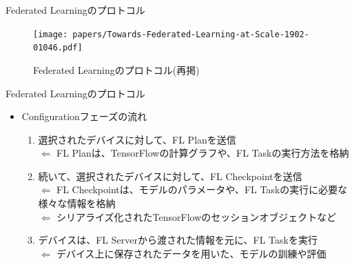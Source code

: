 \documentclass[dvipdfmx,notheorems,t]{beamer}
\begin{document}
\begin{frame}{Federated Learningのプロトコル}

\begin{figure}
	\centering
	\texttt{[image: papers/Towards-Federated-Learning-at-Scale-1902-01046.pdf]}
	\caption{Federated Learningのプロトコル(再掲)~\cite{DBLP:journals/corr/abs-1902-01046}}
\end{figure}

\end{frame}

\begin{frame}{Federated Learningのプロトコル}

\begin{itemize}
	\item Configurationフェーズの流れ
	\begin{enumerate}
		\item 選択されたデバイスに対して、FL Planを送信 \\
		$\Leftarrow$ FL Planは、TensorFlowの計算グラフや、FL Taskの実行方法を格納
		\newline
		
		\item 続いて、選択されたデバイスに対して、FL Checkpointを送信 \\
		$\Leftarrow$ FL Checkpointは、モデルのパラメータや、FL Taskの実行に必要な様々な情報を格納 \\
		$\Leftarrow$ シリアライズ化されたTensorFlowのセッションオブジェクトなど
		\newline
		
		\item デバイスは、FL Serverから渡された情報を元に、FL Taskを実行 \\
		$\Leftarrow$ デバイス上に保存されたデータを用いた、モデルの訓練や評価
	\end{enumerate}
\end{itemize}

\end{frame}
\end{document}
